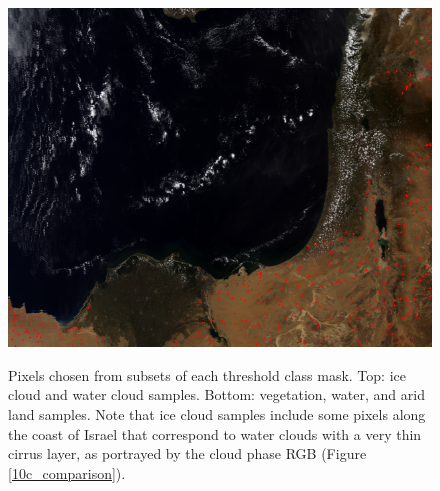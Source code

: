 \documentclass[12pt]{article}
\begin{document}
\begin{figure}[h!]
\begin{center}
{            \includegraphics[width=.3\paperwidth]{figs/masks/cmask_samples_thresh_arid_TC.png}
        }
    \end{center}

    \caption{Pixels chosen from subsets of each threshold class mask. Top: ice cloud and water cloud samples. Bottom: vegetation, water, and arid land samples. Note that ice cloud samples include some pixels along the coast of Israel that correspond to water clouds with a very thin cirrus layer, as portrayed by the cloud phase RGB (Figure \ref{10c_comparison}).}
    \label{thresh_samples}
\end{figure}


\clearpage
\end{document}
